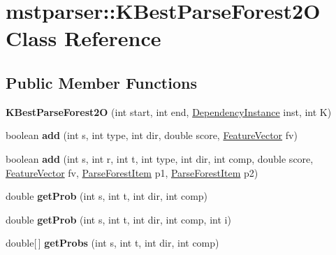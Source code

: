 \hypertarget{classmstparser_1_1KBestParseForest2O}{
\section{mstparser::KBestParseForest2O Class Reference}
\label{classmstparser_1_1KBestParseForest2O}
}
\subsection*{Public Member Functions}
\begin{DoxyCompactItemize}
\item 
\hypertarget{classmstparser_1_1KBestParseForest2O_aa59fea3a2aa10dd56b7ef3f50c52486f}{
{\bfseries KBestParseForest2O} (int start, int end, \hyperlink{classmstparser_1_1DependencyInstance}{DependencyInstance} inst, int K)}
\label{classmstparser_1_1KBestParseForest2O_aa59fea3a2aa10dd56b7ef3f50c52486f}

\item 
\hypertarget{classmstparser_1_1KBestParseForest2O_a20266cb403829af6b477f1d188b2a067}{
boolean {\bfseries add} (int s, int type, int dir, double score, \hyperlink{classmstparser_1_1FeatureVector}{FeatureVector} fv)}
\label{classmstparser_1_1KBestParseForest2O_a20266cb403829af6b477f1d188b2a067}

\item 
\hypertarget{classmstparser_1_1KBestParseForest2O_a78afa47a2871b7b999a817d1e9a7f8da}{
boolean {\bfseries add} (int s, int r, int t, int type, int dir, int comp, double score, \hyperlink{classmstparser_1_1FeatureVector}{FeatureVector} fv, \hyperlink{classmstparser_1_1ParseForestItem}{ParseForestItem} p1, \hyperlink{classmstparser_1_1ParseForestItem}{ParseForestItem} p2)}
\label{classmstparser_1_1KBestParseForest2O_a78afa47a2871b7b999a817d1e9a7f8da}

\item 
\hypertarget{classmstparser_1_1KBestParseForest2O_ac1ab0a97276b3450514cfe14b291446c}{
double {\bfseries getProb} (int s, int t, int dir, int comp)}
\label{classmstparser_1_1KBestParseForest2O_ac1ab0a97276b3450514cfe14b291446c}

\item 
\hypertarget{classmstparser_1_1KBestParseForest2O_acf0b00c9ac6cb6e8c185f2f95bbee125}{
double {\bfseries getProb} (int s, int t, int dir, int comp, int i)}
\label{classmstparser_1_1KBestParseForest2O_acf0b00c9ac6cb6e8c185f2f95bbee125}

\item 
\hypertarget{classmstparser_1_1KBestParseForest2O_a02f335cf12363e2e9a4b2bf8b3976216}{
double\mbox{[}$\,$\mbox{]} {\bfseries getProbs} (int s, int t, int dir, int comp)}
\label{classmstparser_1_1KBestParseForest2O_a02f335cf12363e2e9a4b2bf8b3976216}


\end{DoxyCompactItemize}
